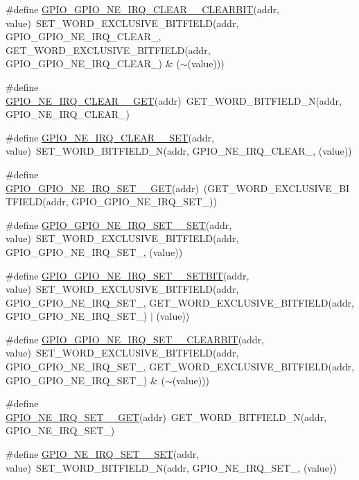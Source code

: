 \begin{DoxyCompactItemize}
\item 
\#define \hyperlink{a00554_a7d427d88a46c29c00b93a8ad9ae3aee0}{GPIO\_\-GPIO\_\-NE\_\-IRQ\_\-CLEAR\_\_\-CLEARBIT}(addr, value)~SET\_\-WORD\_\-EXCLUSIVE\_\-BITFIELD(addr, GPIO\_\-GPIO\_\-NE\_\-IRQ\_\-CLEAR\_, GET\_\-WORD\_\-EXCLUSIVE\_\-BITFIELD(addr, GPIO\_\-GPIO\_\-NE\_\-IRQ\_\-CLEAR\_) \& ($\sim$(value)))
\item 
\#define \hyperlink{a00554_af09edd1b0a154e3027eef8b58b1b4189}{GPIO\_\-NE\_\-IRQ\_\-CLEAR\_\_\-GET}(addr)~GET\_\-WORD\_\-BITFIELD\_\-N(addr, GPIO\_\-NE\_\-IRQ\_\-CLEAR\_)
\item 
\#define \hyperlink{a00554_ab56cc695f474d544ddf4dcd11d612259}{GPIO\_\-NE\_\-IRQ\_\-CLEAR\_\_\-SET}(addr, value)~SET\_\-WORD\_\-BITFIELD\_\-N(addr, GPIO\_\-NE\_\-IRQ\_\-CLEAR\_, (value))
\item 
\#define \hyperlink{a00554_a5f3b420bee915b94cae2ef93091baca4}{GPIO\_\-GPIO\_\-NE\_\-IRQ\_\-SET\_\_\-GET}(addr)~(GET\_\-WORD\_\-EXCLUSIVE\_\-BITFIELD(addr, GPIO\_\-GPIO\_\-NE\_\-IRQ\_\-SET\_))
\item 
\#define \hyperlink{a00554_aec09ddab626eccb2b182b23c604592c4}{GPIO\_\-GPIO\_\-NE\_\-IRQ\_\-SET\_\_\-SET}(addr, value)~SET\_\-WORD\_\-EXCLUSIVE\_\-BITFIELD(addr, GPIO\_\-GPIO\_\-NE\_\-IRQ\_\-SET\_, (value))
\item 
\#define \hyperlink{a00554_a39e6468fd57d9f3cd3cd0ac547ee71b0}{GPIO\_\-GPIO\_\-NE\_\-IRQ\_\-SET\_\_\-SETBIT}(addr, value)~SET\_\-WORD\_\-EXCLUSIVE\_\-BITFIELD(addr, GPIO\_\-GPIO\_\-NE\_\-IRQ\_\-SET\_, GET\_\-WORD\_\-EXCLUSIVE\_\-BITFIELD(addr, GPIO\_\-GPIO\_\-NE\_\-IRQ\_\-SET\_) $|$ (value))
\item 
\#define \hyperlink{a00554_a32a8a8127129c542e1f7fbf50fe5f0bb}{GPIO\_\-GPIO\_\-NE\_\-IRQ\_\-SET\_\_\-CLEARBIT}(addr, value)~SET\_\-WORD\_\-EXCLUSIVE\_\-BITFIELD(addr, GPIO\_\-GPIO\_\-NE\_\-IRQ\_\-SET\_, GET\_\-WORD\_\-EXCLUSIVE\_\-BITFIELD(addr, GPIO\_\-GPIO\_\-NE\_\-IRQ\_\-SET\_) \& ($\sim$(value)))
\item 
\#define \hyperlink{a00554_a63d9654872d7558dcae5703d5df241b2}{GPIO\_\-NE\_\-IRQ\_\-SET\_\_\-GET}(addr)~GET\_\-WORD\_\-BITFIELD\_\-N(addr, GPIO\_\-NE\_\-IRQ\_\-SET\_)
\item 
\#define \hyperlink{a00554_ad15d8432b1e5b00728da261b0af72f11}{GPIO\_\-NE\_\-IRQ\_\-SET\_\_\-SET}(addr, value)~SET\_\-WORD\_\-BITFIELD\_\-N(addr, GPIO\_\-NE\_\-IRQ\_\-SET\_, (value))
\end{DoxyCompactItemize}


